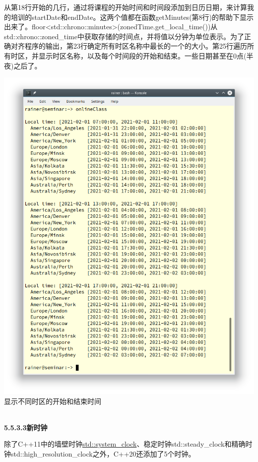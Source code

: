 从第18行开始的几行，通过将课程的开始时间和时间段添加到日历日期，来计算我的培训的startDate和endDate。这两个值都在函数getMinutes(第8行)的帮助下显示出来了。floor<std::chrono::minutes>(zonedTime.get\_local\_time())从std::chrono::zoned\_time中获取存储的时间点，并将值以分钟为单位表示。为了正确对齐程序的输出，第23行确定所有时区名称中最长的一个的大小。第25行遍历所有时区，并显示时区名称，以及每个时间段的开始和结束。一些日期甚至在0点(半夜)之后了。

\begin{center}
\includegraphics[width=1.0\textwidth]{content/3/chapter5/images/28.png}\\
显示不同时区的开始和结束时间
\end{center}


\hspace*{\fill} \\ %
\noindent
\textbf{5.5.3.3\hspace{0.2cm}新时钟}

除了C++11中的墙壁时钟\href{https://www.modernescpp.com/index.php/the-three-clocks}{std::system\_clock}、稳定时钟std::steady\_clock和精确时钟std::high\_resolution\_clock之外，C++20还添加了5个时钟。

